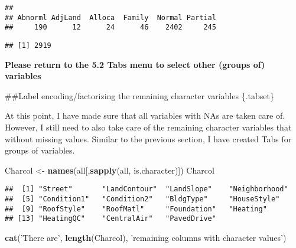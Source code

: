 \documentclass[]{article}
\newenvironment{Shaded}{\begin{snugshade}}{\end{snugshade}}
\newcommand{\KeywordTok}[1]{\textcolor[rgb]{0.13,0.29,0.53}{\textbf{#1}}}
\newcommand{\NormalTok}[1]{#1}
\newcommand{\OperatorTok}[1]{\textcolor[rgb]{0.81,0.36,0.00}{\textbf{#1}}}
\newcommand{\StringTok}[1]{\textcolor[rgb]{0.31,0.60,0.02}{#1}}
\begin{document}
\begin{verbatim}
## 
## Abnorml AdjLand  Alloca  Family  Normal Partial 
##     190      12      24      46    2402     245
\end{verbatim}

\begin{Shaded}
\end{Shaded}

\begin{verbatim}
## [1] 2919
\end{verbatim}

\textbf{Please return to the 5.2 Tabs menu to select other (groups of)
variables}

\#\#Label encoding/factorizing the remaining character variables
\{.tabset\}

At this point, I have made sure that all variables with NAs are taken
care of. However, I still need to also take care of the remaining
character variables that without missing values. Similar to the previous
section, I have created Tabs for groups of variables.

\begin{Shaded}
\begin{Highlighting}[]
\NormalTok{Charcol <-}\StringTok{ }\KeywordTok{names}\NormalTok{(all[,}\KeywordTok{sapply}\NormalTok{(all, is.character)])}
\NormalTok{Charcol}
\end{Highlighting}
\end{Shaded}

\begin{verbatim}
##  [1] "Street"       "LandContour"  "LandSlope"    "Neighborhood"
##  [5] "Condition1"   "Condition2"   "BldgType"     "HouseStyle"  
##  [9] "RoofStyle"    "RoofMatl"     "Foundation"   "Heating"     
## [13] "HeatingQC"    "CentralAir"   "PavedDrive"
\end{verbatim}

\begin{Shaded}
\begin{Highlighting}[]
\KeywordTok{cat}\NormalTok{(}\StringTok{'There are'}\NormalTok{, }\KeywordTok{length}\NormalTok{(Charcol), }\StringTok{'remaining columns with character values'}\NormalTok{)}
\end{Highlighting}
\end{Shaded}
\end{document}
